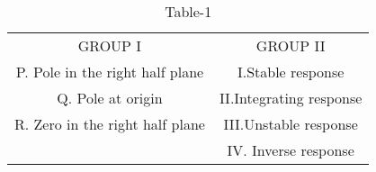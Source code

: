 \begin{table}[htbp]
    \centering
    \begin{tabular}{c|c}
       GROUP I & GROUP II \\ 
       P. Pole in the right half plane & I.Stable response\\
   Q. Pole at origin & II.Integrating response\\
   R. Zero in the right half plane & III.Unstable response\\ 
                & IV. Inverse response
     \end{tabular}
    \caption{Table-1}
    \label{tab:tables/table1.tex}
\end{table}